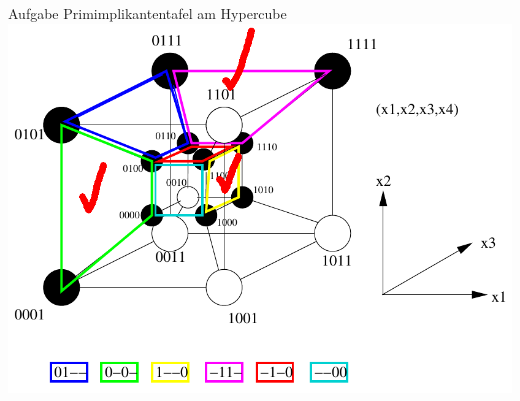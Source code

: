 \begin{frame}[allowframebreaks]{Aufgabe \thesection}{Primimplikantentafel am Hypercube}
  \includegraphics[height=0.6\paperheight, center]{./figures/hypercube.png}
\end{frame}

